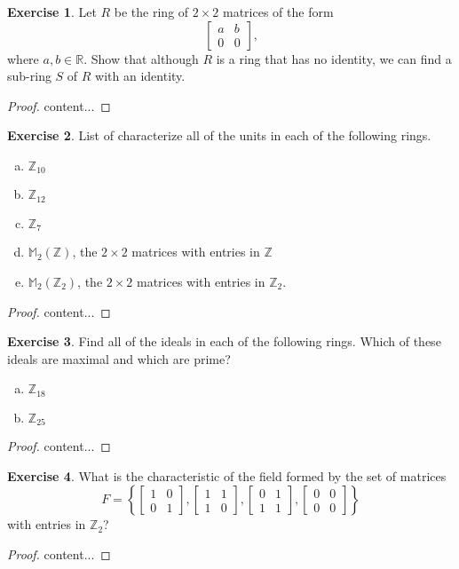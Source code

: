 \documentclass{article}
\theoremstyle{definition}
\newtheorem{theorem}{Exercise}[section]
\theoremstyle{plain}
\newcommand{\R}{\mathbb{R}}
\newcommand{\Z}{\mathbb{Z}}
\begin{document}
	\begin{theorem}
		Let $R$ be the ring of $2 \times 2$ matrices of the form \[\begin{bmatrix} a & b \\ 0 & 0 \end{bmatrix}\text{,} \] where $a,b \in \R$. Show that although $R$ is a ring that has no identity, we can find a sub-ring $S$ of $R$ with an identity. 
	\end{theorem}
	\begin{proof}
		content...
	\end{proof}
	
	
	\begin{theorem}
		List of characterize all of the units in each of the following rings.
		\begin{enumerate}[(a)]
			\item $\Z_{10}$
			\item $\Z_{12}$
			\item $\Z_7$
			\item $\mathbb{M}_2 \left( \Z \right)$, the $2 \times 2$ matrices with entries in $\Z$
			\item $\mathbb{M}_2 \left( \Z_2 \right)$, the $2 \times 2$ matrices with entries in $\Z_2$. 
		\end{enumerate}
	\end{theorem}
	\begin{proof}
		content...
	\end{proof}
	
	\begin{theorem}
		Find all of the ideals in each of the following rings. Which of these ideals are maximal and which are prime?
		\begin{enumerate}[(a)]
			\item $\Z_{18}$
			\item $\Z_{25}$
		\end{enumerate}
	\end{theorem}
	\begin{proof}
		content...
	\end{proof}

	\setcounter{theorem}{8}
	\begin{theorem}
		What is the characteristic of the field formed by the set of matrices \[ F = \left\{ \begin{bmatrix} 1 & 0 \\ 0 & 1 \end{bmatrix}, \begin{bmatrix} 1 & 1\\ 1 & 0 \end{bmatrix}, \begin{bmatrix} 0 & 1 \\ 1 & 1 \end{bmatrix}, \begin{bmatrix} 0 & 0 \\ 0 & 0 \end{bmatrix}  \right\} \] with entries in $\Z_2$?
	\end{theorem}
	\begin{proof}
		content...
	\end{proof}
	
\end{document}

